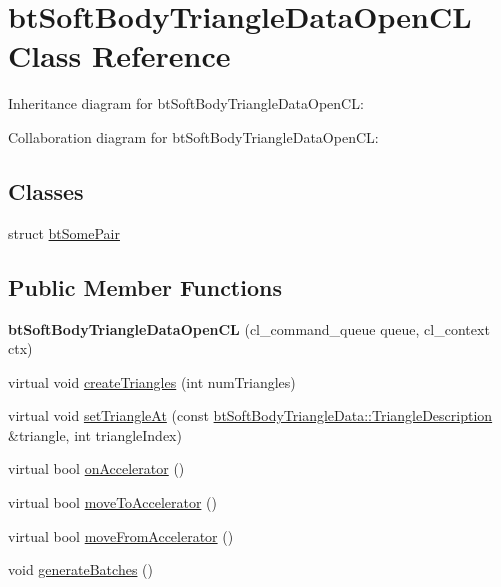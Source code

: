 \hypertarget{classbt_soft_body_triangle_data_open_c_l}{\section{bt\+Soft\+Body\+Triangle\+Data\+Open\+C\+L Class Reference}
\label{classbt_soft_body_triangle_data_open_c_l}
}


Inheritance diagram for bt\+Soft\+Body\+Triangle\+Data\+Open\+C\+L\+:


Collaboration diagram for bt\+Soft\+Body\+Triangle\+Data\+Open\+C\+L\+:
\subsection*{Classes}
\begin{DoxyCompactItemize}
\item 
struct \hyperlink{structbt_soft_body_triangle_data_open_c_l_1_1bt_some_pair}{bt\+Some\+Pair}
\end{DoxyCompactItemize}
\subsection*{Public Member Functions}
\begin{DoxyCompactItemize}
\item 
\hypertarget{classbt_soft_body_triangle_data_open_c_l_ad04c5bf5f3e3f6d3853b5e6117ca3e6b}{{\bfseries bt\+Soft\+Body\+Triangle\+Data\+Open\+C\+L} (cl\+\_\+command\+\_\+queue queue, cl\+\_\+context ctx)}\label{classbt_soft_body_triangle_data_open_c_l_ad04c5bf5f3e3f6d3853b5e6117ca3e6b}

\item 
virtual void \hyperlink{classbt_soft_body_triangle_data_open_c_l_ac92ee63b071604004e9717443248e747}{create\+Triangles} (int num\+Triangles)
\item 
virtual void \hyperlink{classbt_soft_body_triangle_data_open_c_l_ac7f551e48b59ffb15e936c3392d57953}{set\+Triangle\+At} (const \hyperlink{classbt_soft_body_triangle_data_1_1_triangle_description}{bt\+Soft\+Body\+Triangle\+Data\+::\+Triangle\+Description} \&triangle, int triangle\+Index)
\item 
virtual bool \hyperlink{classbt_soft_body_triangle_data_open_c_l_ae6287090bdc3505f89d495ded41660e8}{on\+Accelerator} ()
\item 
virtual bool \hyperlink{classbt_soft_body_triangle_data_open_c_l_af92cd6a17855e603e73595ad229986f5}{move\+To\+Accelerator} ()
\item 
virtual bool \hyperlink{classbt_soft_body_triangle_data_open_c_l_ab03606a0597e8990959452d975ec7bf2}{move\+From\+Accelerator} ()
\item 
void \hyperlink{classbt_soft_body_triangle_data_open_c_l_a9c2ced4b9c5114595129ded0706e33c1}{generate\+Batches} ()
\end{DoxyCompactItemize}

